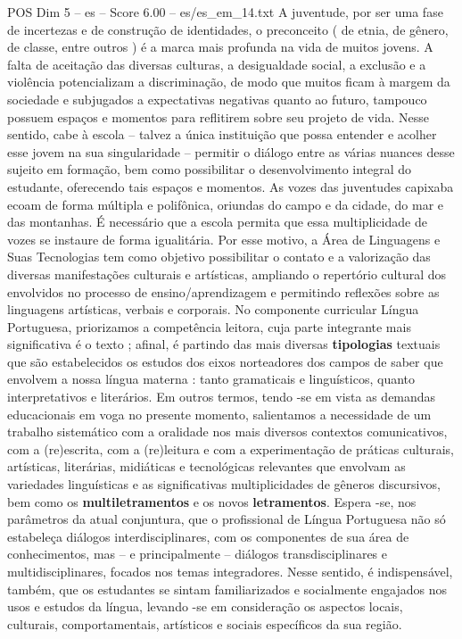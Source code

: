 \begin{textsample}{POS Dim 5 – es – Score 6.00 – es/es\_em\_14.txt}
A juventude, por ser uma fase de incertezas e de construção de identidades, o preconceito ( de etnia, de gênero, de classe, entre outros ) é a marca mais profunda na vida de muitos jovens.
A falta de aceitação das diversas culturas, a desigualdade social, a exclusão e a violência potencializam a discriminação, de modo que muitos ficam à margem da sociedade e subjugados a expectativas negativas quanto ao futuro, tampouco possuem espaços e momentos para reflitirem sobre seu projeto de vida.
Nesse sentido, cabe à escola – talvez a única instituição que possa entender e acolher esse jovem na sua singularidade – permitir o diálogo entre as várias nuances desse sujeito em formação, bem como possibilitar o desenvolvimento integral do estudante, oferecendo tais espaços e momentos.
As vozes das juventudes capixaba ecoam de forma múltipla e polifônica, oriundas do campo e da cidade, do mar e das montanhas.
É necessário que a escola permita que essa multiplicidade de vozes se instaure de forma igualitária.
Por esse motivo, a Área de Linguagens e Suas Tecnologias tem como objetivo possibilitar o contato e a valorização das diversas manifestações culturais e artísticas, ampliando o repertório cultural dos envolvidos no processo de ensino/aprendizagem e permitindo reflexões sobre as linguagens artísticas, verbais e corporais.
No componente curricular Língua Portuguesa, priorizamos a competência leitora, cuja parte integrante mais significativa é o texto ; afinal, é partindo das mais diversas \textbf{tipologias} textuais que são estabelecidos os estudos dos eixos norteadores dos campos de saber que envolvem a nossa língua materna : tanto gramaticais e linguísticos, quanto interpretativos e literários.
Em outros termos, tendo -se em vista as demandas educacionais em voga no presente momento, salientamos a necessidade de um trabalho sistemático com a oralidade nos mais diversos contextos comunicativos, com a (re)escrita, com a (re)leitura e com a experimentação de práticas culturais, artísticas, literárias, midiáticas e tecnológicas relevantes que envolvam as variedades linguísticas e as significativas multiplicidades de gêneros discursivos, bem como os \textbf{multiletramentos} e os novos \textbf{letramentos}.
Espera -se, nos parâmetros da atual conjuntura, que o profissional de Língua Portuguesa não só estabeleça diálogos interdisciplinares, com os componentes de sua área de conhecimentos, mas – e principalmente – diálogos transdisciplinares e multidisciplinares, focados nos temas integradores.
Nesse sentido, é indispensável, também, que os estudantes se sintam familiarizados e socialmente engajados nos usos e estudos da língua, levando -se em consideração os aspectos locais, culturais, comportamentais, artísticos e sociais específicos da sua região.

\end{textsample}
